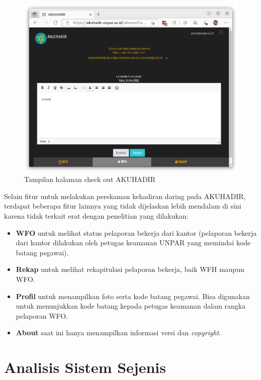 \begin{figure}[H]
	\centering
	\includegraphics[scale=0.3]{Gambar/akuhadir-4-wfh-checkout.png}
	\caption{Tampilan halaman check out AKUHADIR} 
	\label{fig:akuhadir-4-wfh-checkout}
\end{figure}
Selain fitur untuk melakukan perekaman kehadiran daring pada AKUHADIR, terdapat beberapa fitur lainnya yang tidak dijelaskan lebih mendalam di sini karena tidak terkait erat dengan penelitian yang dilakukan:

\begin{itemize}
	\item \textbf{WFO} untuk melihat status pelaporan bekerja dari kantor (pelaporan bekerja dari kantor dilakukan oleh petugas keamanan UNPAR yang memindai kode batang pegawai).
	\item \textbf{Rekap} untuk melihat rekapitulasi pelaporan bekerja, baik WFH maupun WFO.
	\item \textbf{Profil} untuk menampilkan foto serta kode batang pegawai. Bisa digunakan untuk menunjukkan kode batang kepada petugas keamanan dalam rangka pelaporan WFO.
	\item \textbf{About} saat ini hanya menampilkan informasi versi dan \textit{copyright}.
\end{itemize}

\section{Analisis Sistem Sejenis}

